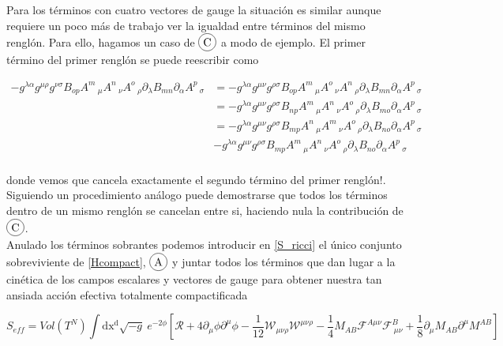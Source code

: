\documentclass{article}
\numberwithin{equation}{section}
\newcommand*\circled[1]{\tikz[baseline=(char.base)]{ \node[shape=circle,draw,inner sep=2pt] (char) {#1};}} %
\begin{document}
Para los términos con cuatro vectores de gauge la situación es similar aunque requiere un poco más de trabajo ver la igualdad entre términos del mismo renglón. Para ello, hagamos un caso de $ \circled{C} $ a modo de ejemplo. El primer término del primer renglón se puede reescribir como

\begin{equation}
\begin{aligned}
- g^{\lambda \alpha} g^{\mu \rho} g^{\nu \sigma} B_{o p} A^{m}\,_{\mu} A^{n}\,_{\nu} A^{o}\,_{\rho} \partial_{\lambda}{B_{m n}} \partial_{\alpha}{A^{p}\,_{\sigma}} &= - g^{\lambda \alpha} g^{\mu \nu} g^{\rho \sigma} B_{o p} A^{m}\,_{\mu} A^{o}\,_{\nu} A^{n}\,_{\rho} \partial_{\lambda}{B_{m n}} \partial_{\alpha}{A^{p}\,_{\sigma}}\\
&= - g^{\lambda \alpha} g^{\mu \nu} g^{\rho \sigma} B_{n p} A^{m}\,_{\mu} A^{n}\,_{\nu} A^{o}\,_{\rho} \partial_{\lambda}{B_{m o}} \partial_{\alpha}{A^{p}\,_{\sigma}}\\
&= - g^{\lambda \alpha} g^{\mu \nu} g^{\rho \sigma} B_{m p} A^{n}\,_{\mu} A^{m}\,_{\nu} A^{o}\,_{\rho} \partial_{\lambda}{B_{n o}} \partial_{\alpha}{A^{p}\,_{\sigma}}\\
&- g^{\lambda \alpha} g^{\mu \nu} g^{\rho \sigma} B_{m p} A^{m}\,_{\mu} A^{n}\,_{\nu} A^{o}\,_{\rho} \partial_{\lambda}{B_{n o}} \partial_{\alpha}{A^{p}\,_{\sigma}}\\
\end{aligned}
\end{equation}

donde vemos que cancela exactamente el segundo término del primer renglón!. Siguiendo un procedimiento análogo puede demostrarse que todos los términos dentro de un mismo renglón se cancelan entre si, haciendo nula la contribución de $ \circled{C} $.\\

Anulado los términos sobrantes podemos introducir en \ref{S_ricci} el único conjunto sobreviviente de \ref{Hcompact}, $ \circled{A} $ y juntar todos los términos que dan lugar a la cinética de los campos escalares y vectores de gauge para obtener nuestra tan ansiada acción efectiva totalmente compactificada

\begin{boxquation}
\begin{equation*}
S_{eff}= Vol(T^N) \int\mathrm{dx^d} \sqrt{-g} \ e^{-2\phi}\left[ \mathcal{R} + 4 \partial_{\mu}\phi\partial^{\mu} \phi - \frac{1}{12} \mathcal{W}_{\mu \nu \rho} \mathcal{W}^{\mu \nu \rho} -\frac{1}{4} M_{A B} \mathcal{F}^{A \mu \nu} \mathcal{F}^B_{\ \mu \nu} + \frac{1}{8} \partial_{\mu} M_{A B} \partial^{\mu} M^{A B}\right] 
\end{equation*}
\end{boxquation}
 
\end{document}
